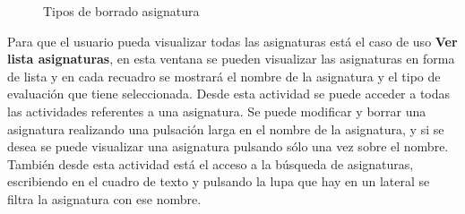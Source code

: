 \begin{figure}[H]
 \centering
 \caption{Tipos de borrado asignatura}
 \label{f:Tipos de borrado asignatura}
\end{figure}

Para que el usuario pueda visualizar todas las asignaturas está el caso de uso \textbf{Ver lista asignaturas}, en esta ventana se pueden visualizar las asignaturas en forma de lista y en cada recuadro se mostrará el nombre de la asignatura y el tipo de evaluación que tiene seleccionada.
Desde esta actividad se puede acceder a todas las actividades referentes a una asignatura. Se puede modificar y borrar una asignatura realizando una pulsación larga en el nombre de la asignatura, y si se desea se puede visualizar una asignatura pulsando sólo una vez sobre el nombre.
También desde esta actividad está el acceso a la búsqueda de asignaturas, escribiendo en el cuadro de texto y pulsando la lupa que hay en un lateral se filtra la asignatura con ese nombre.


